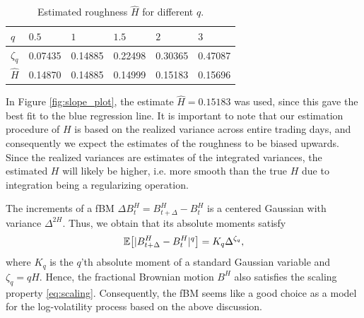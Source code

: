  \begin{table}[H]
\centering
\begin{tabular}{@{}llllll@{}}
\toprule
$q$  & $0.5$   & $1$   & $1.5$ & $2$ & $3$ \\ \midrule 
$\zeta_{q}$ & 0.07435 & 0.14885 & 0.22498     & 0.30365  & 0.47087 \\  \midrule
$\hat{H}$ & 0.14870 & 0.14885 & 0.14999 & 0.15183 & 0.15696 \\ \bottomrule
\end{tabular}
\caption{Estimated roughness $\hat{H}$ for different $q$.}
\label{heston_tab}
\end{table}
In Figure \ref{fig:slope_plot}, the estimate $\hat{H}=0.15183$ was used, since this gave the best fit to the blue regression line. It is important to note that our estimation procedure of $H$ is based on the realized variance across entire trading days, and consequently we expect the estimates of the roughness to be biased upwards. Since the realized variances are estimates of the integrated variances, the estimated $H$ will likely be higher, i.e. more smooth than the true $H$ due to integration being a regularizing operation. 
 
 The increments of a fBM $\Delta B_{t}^{H}=B_{t+\Delta}^{H}-B_{t}^{H}$ is a centered Gaussian with variance $\Delta^{2H}$. Thus, we obtain that its absolute moments satisfy 
 \begin{equation}
     \E\left[|B^{H}_{t+\Delta}-B_{t}^{H}|^{q}\right]=K_{q}\Delta^{\zeta_{q}},
 \end{equation}
 where $K_{q}$ is the $q$'th absolute moment of a standard Gaussian variable and $\zeta_{q}=qH$. Hence, the fractional Brownian motion $B^{H}$ also satisfies the scaling property \eqref{eq:scaling}. Consequently, the fBM seems like a good choice as a model for the log-volatility process based on the above discussion.
 
